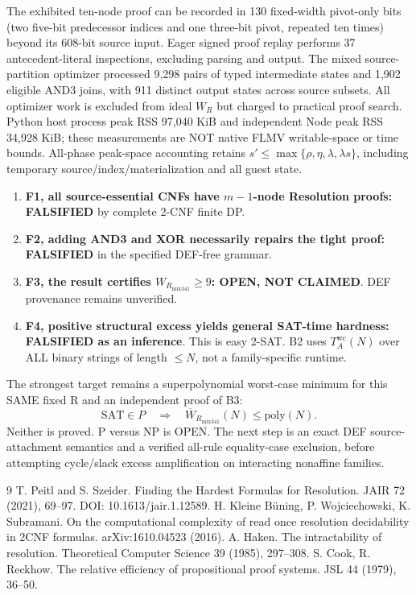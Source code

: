 \documentclass[11pt]{article}
\begin{document}
The exhibited ten-node proof can be recorded in 130 fixed-width pivot-only bits (two five-bit predecessor indices and one three-bit pivot, repeated ten times) beyond its 608-bit source input. Eager signed proof replay performs 37 antecedent-literal inspections, excluding parsing and output. The mixed source-partition optimizer processed 9,298 pairs of typed intermediate states and 1,902 eligible AND3 joins, with 911 distinct output states across source subsets. All optimizer work is excluded from ideal $W_R$ but charged to practical proof search. Python host process peak RSS 97,040 KiB and independent Node peak RSS 34,928 KiB; these measurements are NOT native FLMV writable-space or time bounds. All-phase peak-space accounting retains $s'\le\max\{\rho,\eta,\lambda,\lambda s\}$, including temporary source/index/materialization and all guest state.

\begin{enumerate}
\item[] \textbf{F1, all source-essential CNFs have $m-1$-node Resolution proofs: FALSIFIED} by complete 2-CNF finite DP.
\item[] \textbf{F2, adding AND3 and XOR necessarily repairs the tight proof: FALSIFIED} in the specified DEF-free grammar.
\item[] \textbf{F3, the result certifies $W_{R_{\mathrm{mix341}}}\ge9$: OPEN, NOT CLAIMED}. DEF provenance remains unverified.
\item[] \textbf{F4, positive structural excess yields general SAT-time hardness: FALSIFIED as an inference}. This is easy 2-SAT. B2 uses $T_A^{\mathrm{wc}}(N)$ over ALL binary strings of length $\le N$, not a family-specific runtime.
\end{enumerate}
The strongest target remains a superpolynomial worst-case minimum for this SAME fixed R and an independent proof of B3:
\[
\mathrm{SAT}\in P\quad\Rightarrow\quad
\overline W_{R_{\mathrm{mix341}}}(N)\le\mathrm{poly}(N).
\]
Neither is proved. P versus NP is OPEN. The next step is an exact DEF source-attachment semantics and a verified all-rule equality-case exclusion, before attempting cycle/slack excess amplification on interacting nonaffine families.

\begin{thebibliography}{9}
 T. Peitl and S. Szeider. Finding the Hardest Formulas for Resolution. JAIR 72 (2021), 69--97. DOI: 10.1613/jair.1.12589.
 H. Kleine B\"uning, P. Wojciechowski, K. Subramani. On the computational complexity of read once resolution decidability in 2CNF formulas. arXiv:1610.04523 (2016).
 A. Haken. The intractability of resolution. Theoretical Computer Science 39 (1985), 297--308.
 S. Cook, R. Reckhow. The relative efficiency of propositional proof systems. JSL 44 (1979), 36--50.
\end{thebibliography}
\end{document}
